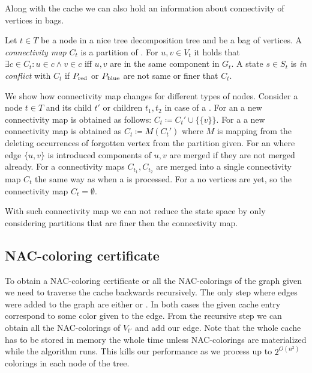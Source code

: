 Along with the cache we can also hold an information about connectivity of
vertices in bags.
%
\begin{definition}
	Let \( t \in T \) be a node in a nice tree decomposition tree and
	\Xt{} be a bag of vertices.
	A \emph{connectivity map} \( C_t \) is a partition of \Xt{}.
	For \( u, v \in V_t \) it holds that
	\( \exists c \in C_t : u \in c \land v \in c \) iff
	\( u, v \) are in the same component in \( G_t \).
	A state \( s \in S_t \) is \emph{in conflict} with \( C_t \)
	if \( P_{\text{red}} \) or \( P_{\text{blue}} \) are not same or finer that \( C_t \).
\end{definition}
%
We show how connectivity map changes for different types of nodes.
Consider a node \( t \in T \) and its child \( t' \)
or children \( t_1, t_2 \) in case of a \JoinNode{}.
%
For an \IntroduceVertexNode{}
a new connectivity map is obtained as follows:
\( C_t \coloneqq C_t' \cup \{\{ v \}\} \).
%
For a \ForgetVertexNode{}
a new connectivity map is obtained as
\( C_t \coloneqq M(C_t') \)
where \( M \) is mapping from the \ForgetVertexNode{}
deleting occurrences of forgotten vertex from the partition given.
%
For an \IntroduceEdgeNode{}
where edge \( \{u, v\} \) is introduced
components of \( u, v \) are merged if they are not merged already.
%
For a \JoinNode{}
connectivity maps \( C_{t_1}, C_{t_2} \) are merged into
a single connectivity map \( C_t \)
the same way as when a \JoinNode{} is processed.
%
For a \LeafNode{}
no vertices are yet, so the connectivity map \( C_t = \emptyset \).

With such connectivity map we can not reduce the state space by only considering
partitions that are finer then the connectivity map.

\subsection{NAC-coloring certificate}

To obtain a NAC-coloring certificate or all the NAC-colorings of the graph
given we need to traverse the cache backwards recursively.
The only step where edges were added to the graph are either \IntroduceEdgeNode{}
or \IntroduceVertexWithEdgesNode{}. In both cases the given cache entry correspond
to some color given to the edge. From the recursive step we can obtain
all the NAC-colorings of \( V_{t'} \) and add our edge.
Note that the whole cache has to be stored in memory the whole time unless
NAC-colorings are materialized while the algorithm runs.
This kills our performance as we process up to \( 2^{O(n^2)} \) colorings
in each node of the tree.

